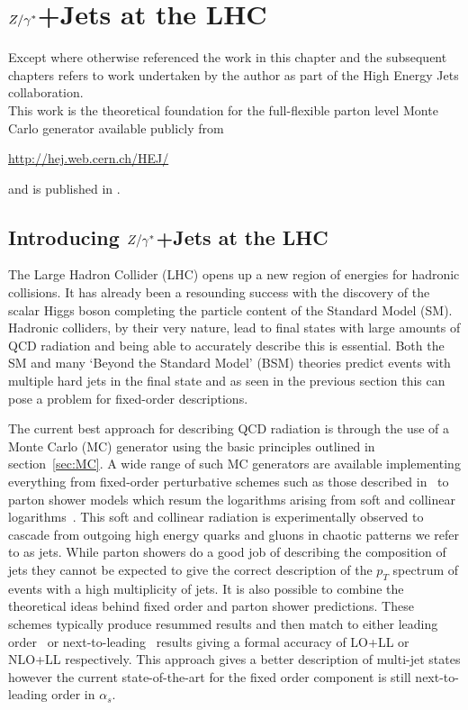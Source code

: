 \chapter{$Z/\gamma^*$+Jets at the LHC}
\label{chap:Zs}

	Except where otherwise referenced the work in this chapter and the subsequent chapters refers to
	work undertaken by the author as part of the High Energy Jets collaboration.\\This work is the theoretical foundation for the
	full-flexible parton level Monte Carlo generator available publicly from

	\begin{center}
		\url{http://hej.web.cern.ch/HEJ/}
	\end{center}

	and is published in \cite{ZPaper}.

\section{Introducing $Z/\gamma^*$+Jets at the LHC}

	The Large Hadron Collider (LHC) opens up a new region of energies for hadronic
	collisions.  It has already been a resounding success with the discovery of the
	scalar Higgs boson completing the particle content of the Standard Model (SM).
	Hadronic colliders, by their very nature, lead to final states with large
	amounts of QCD radiation and being able to accurately describe this is
	essential.  Both the SM and many `Beyond the Standard Model' (BSM) theories
	predict events with multiple hard jets in the final state and as seen in the
	previous section this can pose a problem for fixed-order descriptions.

	The current best approach for describing QCD radiation is through the use of
	a Monte Carlo (MC) generator using the basic principles outlined in section~\ref{sec:MC}.
	A wide range of such MC generators are available implementing everything from
	fixed-order perturbative schemes such as those described in~\cite{} to parton
	shower models which resum the logarithms arising from soft and collinear logarithms~\cite{}.
	This soft and collinear radiation is experimentally observed to cascade from outgoing
	high energy quarks and gluons in chaotic patterns we refer to as jets.  While parton
	showers do a good job of describing the composition of jets they cannot be expected to give the correct
	description of the $p_T$ spectrum of events with a high multiplicity of jets.
	It is also possible to combine the
	theoretical ideas behind fixed order and parton shower predictions.  These schemes typically
	produce resummed results and then match to either leading order~\cite{} or next-to-leading~\cite{}
	results giving a formal accuracy of LO+LL or NLO+LL respectively.  This approach gives a
	better description of multi-jet states however the current state-of-the-art for the
	fixed order component is still next-to-leading order in $\alpha_s$.


